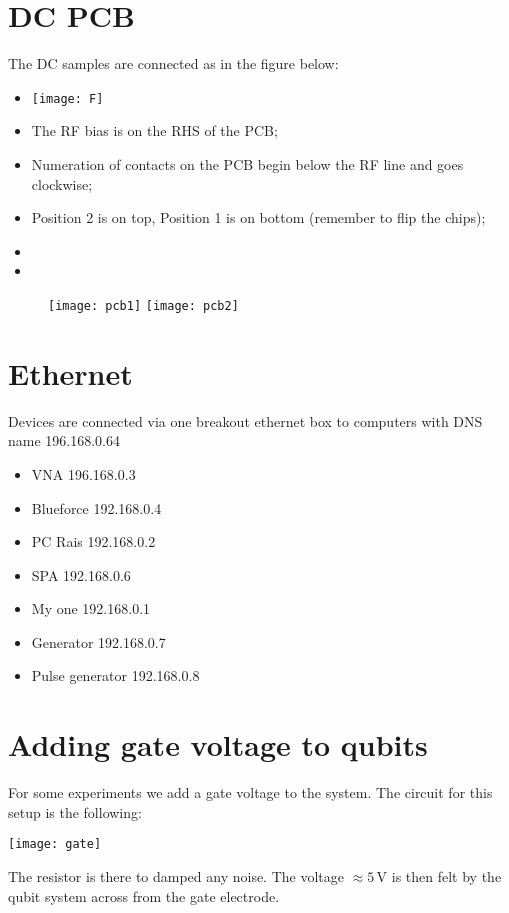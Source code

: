  \section{DC PCB}
  The DC samples are connected as in the figure below:
  \begin{itemize}
  	\item {\LARGE {}}
  	\texttt{[image: F]}
  	\item The RF bias is on the RHS of the PCB;
  	\item Numeration of contacts on the PCB begin below the RF line and goes clockwise;
  	\item Position 2 is on top, Position 1 is on bottom (remember to flip the chips);
  	\item {}
  	\item {}
  \end{itemize}
 
 \begin{figure}[h]
 	\centering
 	\texttt{[image: pcb1]}
 	\texttt{[image: pcb2]}
 \end{figure}
 \newpage 
 
 \section{Ethernet}
  Devices are connected via one breakout ethernet box to computers with DNS name 196.168.0.64
  \begin{itemize}
  	\item VNA 196.168.0.3
  	\item Blueforce 192.168.0.4
  	\item PC Rais 192.168.0.2
 	\item SPA 192.168.0.6
 	\item My one 192.168.0.1
 	\item Generator 192.168.0.7 
 	\item Pulse generator 192.168.0.8	
  \end{itemize}
 
 
\newpage
 
 \section{Adding gate voltage to qubits}
For some experiments we add a gate voltage to the system. The circuit for this setup is the following:

\begin{center}
	\texttt{[image: gate]}
\end{center}

The resistor is there to damped any noise. The voltage $ \approx 5\, $V is then felt by the qubit system across from the gate electrode.

\newpage 